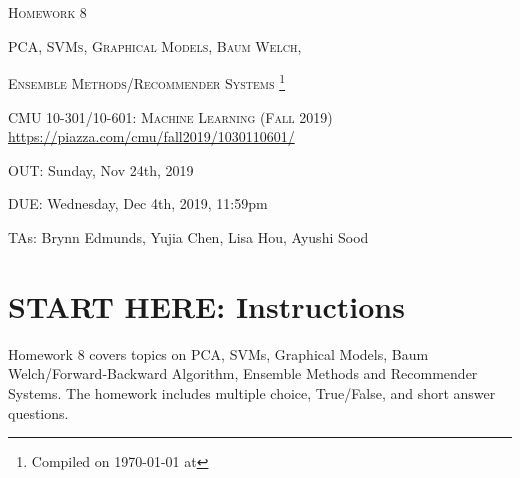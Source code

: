 \documentclass[12pt]{article}
\begin{document}
\section*{}
\begin{center}
  \centerline{\textsc{\LARGE  Homework 8}}
  \vspace{0.5em}
  \centerline{\textsc{\LARGE PCA, SVMs, Graphical Models, Baum Welch, }}\centerline{\textsc{\LARGE Ensemble Methods/Recommender Systems}
  \footnote{Compiled on \today{} at \currenttime{}}}
  \vspace{1em}
  \textsc{\large CMU 10-301/10-601: Machine Learning (Fall 2019)} \\
  \vspace{0.5em}
  \url{https://piazza.com/cmu/fall2019/1030110601/} \\
  \vspace{0.5em}
  \centerline{OUT: Sunday, Nov 24th, 2019}
  \vspace{0.5em}
  \centerline{DUE: Wednesday, Dec 4th, 2019, 11:59pm}
    \centerline{TAs: Brynn Edmunds, Yujia Chen, Lisa Hou, Ayushi Sood}
\end{center}


\section*{START HERE: Instructions}

\begin{notebox}
Homework 8 covers topics on PCA, SVMs, Graphical Models, Baum Welch/Forward-Backward Algorithm, Ensemble Methods and Recommender Systems. The homework includes multiple choice, True/False, and short answer questions. 
\end{notebox}
\end{document}
